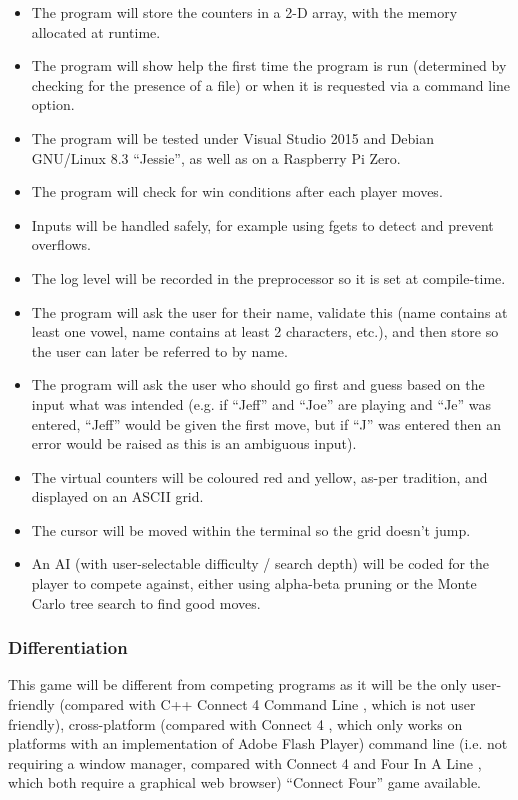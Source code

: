 \documentclass[11pt,onecolumn]{article}
\begin{document}
\begin{itemize}
\item The program will store the counters in a 2-D array, with the memory allocated at runtime.
\item The program will show help the first time the program is run (determined by checking for the presence of a file) or when it is requested via a command line option.
\item The program will be tested under Visual Studio 2015 and Debian GNU/Linux 8.3 ``Jessie'', as well as on a Raspberry Pi Zero.
\item The program will check for win conditions after each player moves.
\item Inputs will be handled safely, for example using fgets to detect and prevent overflows.
\item The log level will be recorded in the preprocessor so it is set at compile-time.
\item The program will ask the user for their name, validate this (name contains at least one vowel, name contains at least 2 characters, etc.), and then store so the user can later be referred to by name.
\item The program will ask the user who should go first and guess based on the input what was intended (e.g. if ``Jeff'' and ``Joe'' are playing and ``Je'' was entered, ``Jeff'' would be given the first move, but if ``J'' was entered then an error would be raised as this is an ambiguous input).
\item The virtual counters will be coloured red and yellow, as-per tradition, and displayed on an ASCII grid.
\item The cursor will be moved within the terminal so the grid doesn't jump.
\item An AI (with user-selectable difficulty / search depth) will be coded for the player to compete against, either using alpha-beta pruning or the Monte Carlo tree search to find good moves.
\end{itemize}

\subsubsection{Differentiation}


This game will be different from competing programs as it will be the only user-friendly (compared with C++ Connect 4 Command Line \cite{MichaelEstesCPPC4Cmd}, which is not user friendly), cross-platform (compared with Connect 4 \cite{OwensWorldConnect4}, which only works on platforms with an implementation of Adobe Flash Player) command line (i.e. not requiring a window manager, compared with Connect 4 \cite{OwensWorldConnect4} and Four In A Line \cite{MathsIsFunFourInALine}, which both require a graphical web browser) ``Connect Four'' game available.
\end{document}

